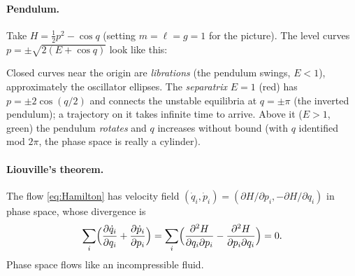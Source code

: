 \documentclass[11pt]{article}
\begin{document}
\paragraph{Pendulum.} Take $H=\tfrac12p^2-\cos q$ (setting $m=\ell=g=1$ for the picture). The level curves $p=\pm\sqrt{2(E+\cos q)}$ look like this:
\begin{center}
\end{center}
Closed curves near the origin are \emph{librations} (the pendulum swings, $E<1$), approximately the oscillator ellipses. The \emph{separatrix} $E=1$ (red) has $p=\pm2\cos(q/2)$ and connects the unstable equilibria at $q=\pm\pi$ (the inverted pendulum); a trajectory on it takes infinite time to arrive. Above it ($E>1$, green) the pendulum \emph{rotates} and $q$ increases without bound (with $q$ identified mod $2\pi$, the phase space is really a cylinder).

\paragraph{Liouville's theorem.} The flow \eqref{eq:Hamilton} has velocity field $(\dot q_i,\dot p_i)=(\partial H/\partial p_i,-\partial H/\partial q_i)$ in phase space, whose divergence is
\begin{equation}
 \sum_i\Bigl(\frac{\partial \dot q_i}{\partial q_i}+\frac{\partial \dot p_i}{\partial p_i}\Bigr)=\sum_i\Bigl(\frac{\partial^2H}{\partial q_i\partial p_i}-\frac{\partial^2H}{\partial p_i\partial q_i}\Bigr)=0 .
\end{equation}
Phase space flows like an incompressible fluid.
\end{document}
